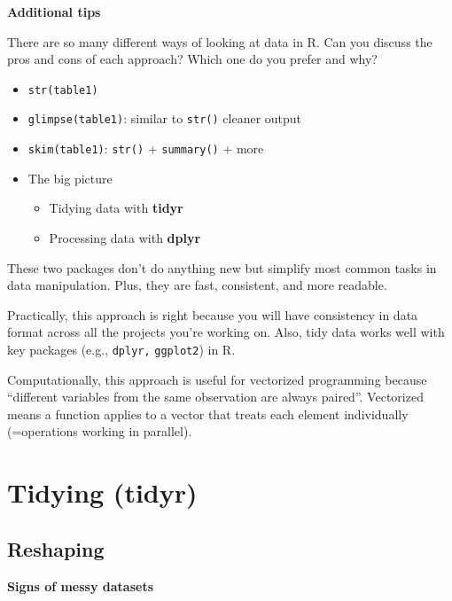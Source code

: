 \documentclass[
]{book}
\providecommand{\tightlist}{%
  \setlength{\itemsep}{0pt}\setlength{\parskip}{0pt}}
\begin{document}
\textbf{Additional tips}

There are so many different ways of looking at data in R. Can you discuss the pros and cons of each approach? Which one do you prefer and why?

\begin{itemize}
\item
  \texttt{str(table1)}
\item
  \texttt{glimpse(table1)}: similar to \texttt{str()} cleaner output
\item
  \texttt{skim(table1)}: \texttt{str()} + \texttt{summary()} + more
\item
  The big picture

  \begin{itemize}
  \tightlist
  \item
    Tidying data with \textbf{tidyr}
  \item
    Processing data with \textbf{dplyr}
  \end{itemize}
\end{itemize}

These two packages don't do anything new but simplify most common tasks in data manipulation. Plus, they are fast, consistent, and more readable.

Practically, this approach is right because you will have consistency in data format across all the projects you're working on. Also, tidy data works well with key packages (e.g., \texttt{dplyr,} \texttt{ggplot2}) in R.

Computationally, this approach is useful for vectorized programming because ``different variables from the same observation are always paired''. Vectorized means a function applies to a vector that treats each element individually (=operations working in parallel).

\hypertarget{tidying-tidyr}{%
\section{Tidying (tidyr)}\label{tidying-tidyr}}

\hypertarget{reshaping}{%
\subsection{Reshaping}\label{reshaping}}

\textbf{Signs of messy datasets}
\end{document}
